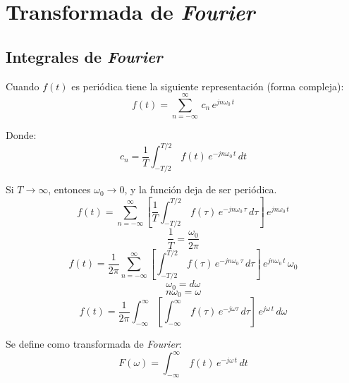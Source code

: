 \chapter{Transformada de \emph{Fourier}}

\section{Integrales de \emph{Fourier}}
\begin{figure}[H]
    \centering
    
\end{figure}

Cuando $f(t)$ es periódica tiene la siguiente representación (forma compleja):
\begin{equation*}
    f(t)=\sum_{n=-\infty}^\infty\,c_n\,e^{jn\omega_0\,t}
\end{equation*}

Donde:
\begin{equation*}
    c_n=\frac{1}{T}\int_{-T/2}^{T/2}\,f(t)\,e^{-jn\omega_0\,t}\,dt
\end{equation*}

Si $T\to\infty$, entonces $\omega_0\to0$, y la función deja de ser periódica.
\begin{equation*}
    f(t)=\sum_{n=-\infty}^\infty\left[
        \frac{1}{T}\int_{-T/2}^{T/2}\,f(\tau)\,e^{-jn\omega_0\,\tau}\,d\tau
    \right]\,e^{jn\omega_0\,t}
\end{equation*}
\begin{equation*}
    \frac{1}{T}=\frac{\omega_0}{2\pi}
\end{equation*}
\begin{equation*}
    f(t)=\frac{1}{2\pi}\sum_{n=-\infty}^\infty\left[
        \int_{-T/2}^{T/2}\,f(\tau)\,e^{-jn\omega_0\,\tau}\,d\tau
    \right]\,e^{jn\omega_0\,t}\,\omega_0
\end{equation*}
\begin{equation*}
    \omega_0=d\omega
\end{equation*}
\begin{equation*}
    n\omega_0=\omega
\end{equation*}
\begin{equation}
    f(t)=\frac{1}{2\pi}\int_{-\infty}^\infty\left[
        \int_{-\infty}^{\infty}\,f(\tau)\,e^{-j\omega\tau}\,d\tau
    \right]\,e^{j\omega\,t}\,d\omega
\end{equation}

Se define como transformada de \emph{Fourier}:
\begin{equation}
    F(\omega)=\int_{-\infty}^{\infty}\,f(t)\,e^{-j\omega\,t}\,dt
\end{equation}


